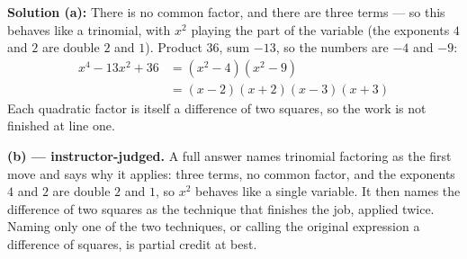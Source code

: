 \documentclass[12pt]{article}
\begin{document}
\textbf{Solution (a):} There is no common factor, and there are three terms --- so this behaves like a trinomial, with $x^2$ playing the part of the variable (the exponents $4$ and $2$ are double $2$ and $1$). Product $36$, sum $-13$, so the numbers are $-4$ and $-9$:
\begin{align*}
  x^4 - 13x^2 + 36 &= (x^2 - 4)(x^2 - 9) \\
                   &= (x-2)(x+2)(x-3)(x+3)
\end{align*}
Each quadratic factor is itself a difference of two squares, so the work is not finished at line one. 

\textbf{(b) --- instructor-judged.} A full answer names trinomial factoring as the first move and says why it applies: three terms, no common factor, and the exponents $4$ and $2$ are double $2$ and $1$, so $x^2$ behaves like a single variable. It then names the difference of two squares as the technique that finishes the job, applied twice. Naming only one of the two techniques, or calling the original expression a difference of squares, is partial credit at best.
\end{document}
